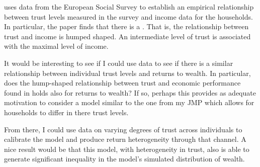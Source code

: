 \documentclass{scrartcl}
\begin{document}
\cite{jbpglg2016} uses data from the European Social Survey to establish an empirical relationship between trust levels measured in the survey and income data for the households. 
In particular, the paper finds that there is a . That is, the relationship between trust and income is humped shaped. 
An intermediate level of trust is associated with the maximal level of income. 

It would be interesting to see if I could use data to see if there is a similar relationship between individual trust levels and returns to wealth. 
In particular, does the hump-shaped relationship between trust and economic performance found in \cite{jbpglg2016} holds also for returns to wealth?
If so, perhaps this provides as adequate motivation to consider a model similar to the one from my JMP which allows for households to differ in there trust levels.

From there, I could use data on varying degrees of trust across individuals to calibrate the model and produce return heterogeneity through that channel. 
A nice result would be that this model, with heterogeneity in trust, also is able to generate significant inequality in the model's simulated distribution of wealth. 
\end{document}
